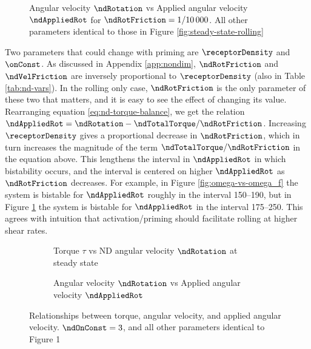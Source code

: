 \begin{figure}
  \centering

  \caption{Angular velocity $\ndRotation$ vs Applied angular velocity
    $\ndAppliedRot$ for $\ndRotFriction = 1/10\, 000$. All other
    parameters identical to those in Figure
    \ref{fig:steady-state-rolling}}
  \label{fig:rolling-large-Nt}
\end{figure}

Two parameters that could change with priming are $\receptorDensity$
and $\onConst$. As discussed in Appendix \ref{app:nondim},
$\ndRotFriction$ and $\ndVelFriction$ are inversely proportional to
$\receptorDensity$ (also in Table \ref{tab:nd-vars}). In the rolling
only case, $\ndRotFriction$ is the only parameter of these two that
matters, and it is easy to see the effect of changing its
value. Rearranging equation \eqref{eq:nd-torque-balance}, we get the
relation
$\ndAppliedRot = \ndRotation -
\ndTotalTorque/\ndRotFriction$. Increasing $\receptorDensity$ gives a
proportional decrease in $\ndRotFriction$, which in turn increases the
magnitude of the term $\ndTotalTorque/\ndRotFriction$ in the equation
above. This lengthens the interval in $\ndAppliedRot$ in which
bistability occurs, and the interval is centered on higher
$\ndAppliedRot$ as $\ndRotFriction$ decreases. For example, in Figure
\ref{fig:omega-vs-omega_f} the system is bistable for $\ndAppliedRot$
roughly in the interval 150--190, but in Figure
\ref{fig:rolling-large-Nt} the system is bistable for $\ndAppliedRot$
in the interval 175--250. This agrees with intuition that
activation/priming should facilitate rolling at higher shear rates.

\begin{figure}
  \centering
  \begin{subfigure}{0.45\textwidth}

    \caption{Torque $\tau$ vs ND angular velocity $\ndRotation$ at
      steady state}
    \label{fig:tau-vs-omega-kappa-large}
  \end{subfigure}
  \quad
  \begin{subfigure}{0.45\textwidth}

    \caption{Angular velocity $\ndRotation$ vs Applied angular
      velocity $\ndAppliedRot$}
    \label{fig:omega-vs-omega_f-kappa-large}
  \end{subfigure}
  \caption{Relationships between torque, angular velocity, and applied
    angular velocity. $\ndOnConst = 3$, and all other parameters
    identical to Figure 1}
  \label{fig:rolling-large-kap}
\end{figure}

